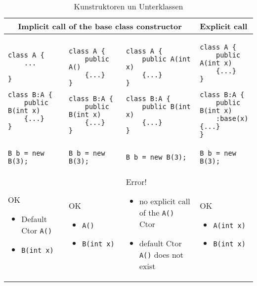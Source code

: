 \begin{table}
\lstset{numbers=none, tabsize=3, frame=None}
\centering
\begin{tabular}{|p{4cm}|p{4cm}|p{4cm}|p{4cm}|}
\hline
\multicolumn{3}{|c|}{Implicit call of the base class constructor} & Explicit call
\\ \hline
\begin{lstlisting}
class A {
	...

}

class B:A {
	public B(int x) 
	{...}
}
\end{lstlisting} &
\begin{lstlisting}
class A { 
	public A() 
	{...}
}

class B:A {
	public B(int x) 
	{...}
}
\end{lstlisting} &
\begin{lstlisting}
class A { 
	public A(int x) 
	{...}
}

class B:A {
	public B(int x) 
	{...}
}
\end{lstlisting} &
\begin{lstlisting}
class A { 
	public A(int x) 
	{...}
}

class B:A {
	public B(int x)
	:base(x) {...}
}
\end{lstlisting}
\\ \hline
\lstinline!B b = new B(3);! & \lstinline!B b = new B(3);! & \lstinline!B b = new B(3);! & \lstinline!B b = new B(3);!
\\ \hline
OK
\begin{itemize}
	\item Default Ctor \lstinline!A()!
	\item \lstinline!B(int x)!
\end{itemize}& 
OK
\begin{itemize}
	\item \lstinline!A()!
	\item \lstinline!B(int x)!
\end{itemize}& 
Error!
\begin{itemize}
	\item no explicit call of the \lstinline!A()! Ctor
	\item default Ctor \lstinline!A()! does not exist
\end{itemize}& 
OK
\begin{itemize}
	\item \lstinline!A(int x)!
	\item \lstinline!B(int x)!
\end{itemize}
\\ \hline
\end{tabular}
\caption{Kunstruktoren un Unterklassen}
\end{table}


